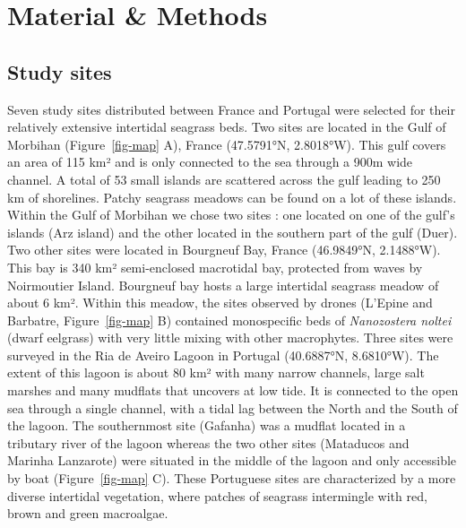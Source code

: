 \documentclass[
  number]{elsarticle}
\begin{document}
\section{Material \& Methods}\label{material-methods}

\subsection{Study sites}\label{study-sites}

Seven study sites distributed between France and Portugal were selected
for their relatively extensive intertidal seagrass beds. Two sites are
located in the Gulf of Morbihan (Figure~\ref{fig-map} A), France
(47.5791°N, 2.8018°W). This gulf covers an area of 115 km² and is only
connected to the sea through a 900m wide channel. A total of 53 small
islands are scattered across the gulf leading to 250 km of shorelines.
Patchy seagrass meadows can be found on a lot of these islands. Within
the Gulf of Morbihan we chose two sites : one located on one of the
gulf's islands (Arz island) and the other located in the southern part
of the gulf (Duer). Two other sites were located in Bourgneuf Bay,
France (46.9849°N, 2.1488°W). This bay is 340 km² semi-enclosed
macrotidal bay, protected from waves by Noirmoutier Island. Bourgneuf
bay hosts a large intertidal seagrass meadow of about 6 km². Within this
meadow, the sites observed by drones (L'Epine and Barbatre,
Figure~\ref{fig-map} B) contained monospecific beds of \emph{Nanozostera
noltei} (dwarf eelgrass) with very little mixing with other macrophytes.
Three sites were surveyed in the Ria de Aveiro Lagoon in Portugal
(40.6887°N, 8.6810°W). The extent of this lagoon is about 80 km² with
many narrow channels, large salt marshes and many mudflats that uncovers
at low tide. It is connected to the open sea through a single channel,
with a tidal lag between the North and the South of the lagoon. The
southernmost site (Gafanha) was a mudflat located in a tributary river
of the lagoon whereas the two other sites (Mataducos and Marinha
Lanzarote) were situated in the middle of the lagoon and only accessible
by boat (Figure~\ref{fig-map} C). These Portuguese sites are
characterized by a more diverse intertidal vegetation, where patches of
seagrass intermingle with red, brown and green macroalgae.
\end{document}
